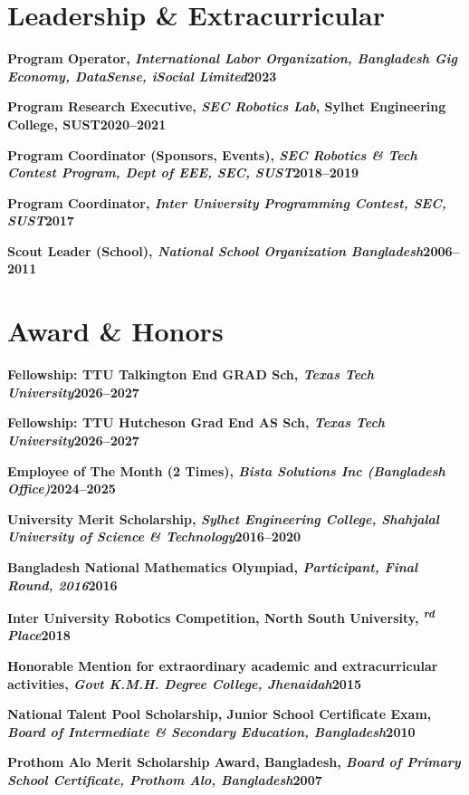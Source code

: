 \documentclass[10pt,letterpaper]{article}
\newcommand{\entry}[2]{\vspace{2pt}\par\noindent\textbf{#1}\hfill\textbf{#2}\par\nopagebreak}
\begin{document}
\section{Leadership \& Extracurricular}
\entry{Program Operator, \textit{\normalfont International Labor Organization, Bangladesh Gig Economy, DataSense, iSocial Limited}}{2023}
\entry{Program Research Executive, \textit{\normalfont SEC Robotics Lab}, Sylhet Engineering College, SUST}{2020--2021}
\entry{Program Coordinator (Sponsors, Events), \textit{\normalfont SEC Robotics \& Tech Contest Program, Dept of EEE, SEC, SUST}}{2018--2019}
\entry{Program Coordinator, \textit{\normalfont Inter University Programming Contest, SEC, SUST}}{2017}
\entry{Scout Leader (School), \textit{\normalfont National School Organization Bangladesh}}{2006--2011}

\section{Award \& Honors}
\entry{Fellowship: TTU Talkington End GRAD Sch, \textit{\normalfont Texas Tech University}}{2026--2027}
\entry{Fellowship: TTU Hutcheson Grad End AS Sch, \textit{\normalfont Texas Tech University}}{2026--2027}
\entry{Employee of The Month (2 Times), \textit{\normalfont Bista Solutions Inc (Bangladesh Office)}}{2024--2025}
\entry{University Merit Scholarship, \textit{\normalfont Sylhet Engineering College, Shahjalal University of Science \& Technology}}{2016--2020}
\entry{Bangladesh National Mathematics Olympiad, \textit{\normalfont Participant, Final Round, 2016}}{2016}
\entry{Inter University Robotics Competition, North South University, \textit{\normalfont 3\textsuperscript{rd} Place}}{2018}
\entry{Honorable Mention for extraordinary academic and extracurricular activities, \textit{\normalfont Govt K.M.H. Degree College, Jhenaidah}}{2015}
\entry{National Talent Pool Scholarship, Junior School Certificate Exam, \textit{\normalfont Board of Intermediate \& Secondary Education, Bangladesh}}{2010}
\entry{Prothom Alo Merit Scholarship Award, Bangladesh, \textit{\normalfont Board of Primary School Certificate, Prothom Alo, Bangladesh}}{2007}

\end{document}
